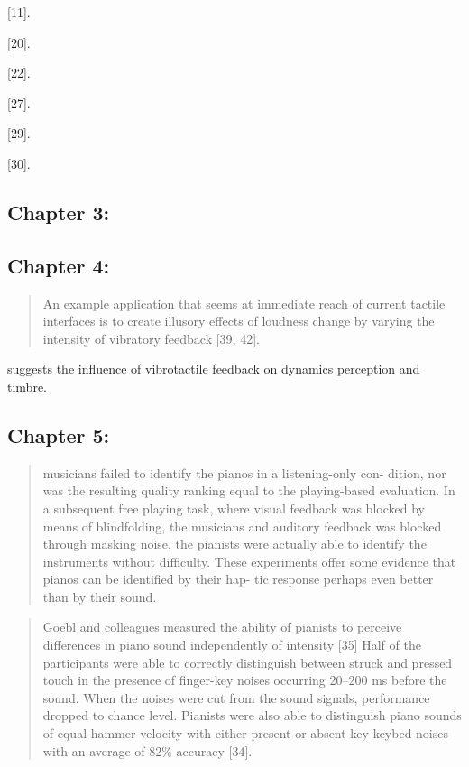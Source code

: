 [11].

[20].

[22].

[27].

[29].

[30].

\subsection{Chapter 3: \cite{hayward_brief_2018}}




\subsection{Chapter 4: \cite{fontana_perception_2018}}

\begin{quotation}
    An example application that seems at immediate reach of current tactile interfaces is to create illusory effects of loudness change by varying the intensity of vibratory feedback [39, 42].
\end{quotation}

suggests the influence of vibrotactile feedback on dynamics perception and timbre.  

\subsection{Chapter 5: \cite{charalampos_role_2018}}


\begin{quotation}
    musicians failed to identify the pianos in a listening-only con- dition, nor was the resulting quality ranking equal to the playing-based evaluation. In a subsequent free playing task, where visual feedback was blocked by means of blindfolding, the musicians and auditory feedback was blocked through masking noise, the pianists were actually able to identify the instruments without difficulty. These experiments offer some evidence that pianos can be identified by their hap- tic response perhaps even better than by their sound. 
\end{quotation}

\begin{quotation}
    Goebl and colleagues measured the ability of pianists to perceive differences in piano sound independently of intensity [35]
     Half of the participants were able to correctly distinguish between struck and pressed touch in the presence of finger-key noises occurring 20–200 ms before the sound. When the noises were cut from the sound signals, performance dropped to chance level. Pianists were also able to distinguish piano sounds of equal hammer velocity with either present or absent key-keybed noises with an average of 82\% accuracy  [34].
\end{quotation}

